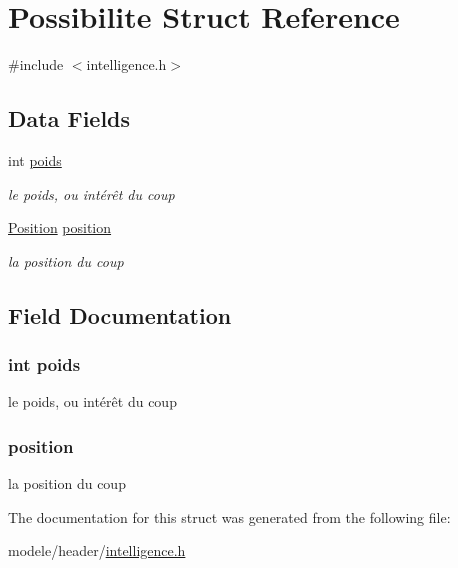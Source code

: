 \hypertarget{struct_possibilite}{\section{Possibilite Struct Reference}
\label{struct_possibilite}
}


{\ttfamily \#include $<$intelligence.\-h$>$}

\subsection*{Data Fields}
\begin{DoxyCompactItemize}
\item 
int \hyperlink{struct_possibilite_ac1abe8fa63a4167cf11ef707f524f0c4}{poids}
\begin{DoxyCompactList}\small\item\em le poids, ou intérêt du coup \end{DoxyCompactList}\item 
\hyperlink{struct_position}{Position} \hyperlink{struct_possibilite_a4d84949a19a29d3bb4dd2635c8241a83}{position}
\begin{DoxyCompactList}\small\item\em la position du coup \end{DoxyCompactList}\end{DoxyCompactItemize}


\subsection{Field Documentation}
\hypertarget{struct_possibilite_ac1abe8fa63a4167cf11ef707f524f0c4}{
\subsubsection[{poids}]{\setlength{\rightskip}{0pt plus 5cm}int poids}}\label{struct_possibilite_ac1abe8fa63a4167cf11ef707f524f0c4}


le poids, ou intérêt du coup 

\hypertarget{struct_possibilite_a4d84949a19a29d3bb4dd2635c8241a83}{
\subsubsection[{position}]{ position}}\label{struct_possibilite_a4d84949a19a29d3bb4dd2635c8241a83}


la position du coup 



The documentation for this struct was generated from the following file\-:\begin{DoxyCompactItemize}
\item 
modele/header/\hyperlink{intelligence_8h}{intelligence.\-h}\end{DoxyCompactItemize}

